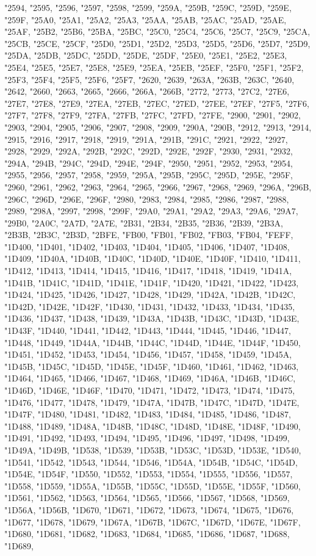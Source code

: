 "2594, "2595, "2596, "2597, "2598, "2599, "259A, "259B, "259C, "259D, "259E, "259F, "25A0, "25A1, "25A2, "25A3, "25AA, "25AB, "25AC, "25AD, "25AE, "25AF, "25B2, "25B6, "25BA, "25BC, "25C0, "25C4, "25C6, "25C7, "25C9, "25CA, "25CB, "25CE, "25CF, "25D0, "25D1, "25D2, "25D3, "25D5, "25D6, "25D7, "25D9, "25DA, "25DB, "25DC, "25DD, "25DE, "25DF, "25E0, "25E1, "25E2, "25E3, "25E4, "25E5, "25E7, "25E8, "25E9, "25EA, "25EB, "25EF, "25F0, "25F1, "25F2, "25F3, "25F4, "25F5, "25F6, "25F7, "2620, "2639, "263A, "263B, "263C, "2640, "2642, "2660, "2663, "2665, "2666, "266A, "266B, "2772, "2773, "27C2, "27E6, "27E7, "27E8, "27E9, "27EA, "27EB, "27EC, "27ED, "27EE, "27EF, "27F5, "27F6, "27F7, "27F8, "27F9, "27FA, "27FB, "27FC, "27FD, "27FE, "2900, "2901, "2902, "2903, "2904, "2905, "2906, "2907, "2908, "2909, "290A, "290B, "2912, "2913, "2914, "2915, "2916, "2917, "2918, "2919, "291A, "291B, "291C, "2921, "2922, "2927, "2928, "2929, "292A, "292B, "292C, "292D, "292E, "292F, "2930, "2931, "2932, "294A, "294B, "294C, "294D, "294E, "294F, "2950, "2951, "2952, "2953, "2954, "2955, "2956, "2957, "2958, "2959, "295A, "295B, "295C, "295D, "295E, "295F, "2960, "2961, "2962, "2963, "2964, "2965, "2966, "2967, "2968, "2969, "296A, "296B, "296C, "296D, "296E, "296F, "2980, "2983, "2984, "2985, "2986, "2987, "2988, "2989, "298A, "2997, "2998, "299F, "29A0, "29A1, "29A2, "29A3, "29A6, "29A7, "29B0, "2A0C, "2A7D, "2A7E, "2B31, "2B34, "2B35, "2B36, "2B39, "2B3A, "2B3B, "2B3C, "2B3D, "2BFE, "FB00, "FB01, "FB02, "FB03, "FB04, "FEFF, "1D400, "1D401, "1D402, "1D403, "1D404, "1D405, "1D406, "1D407, "1D408, "1D409, "1D40A, "1D40B, "1D40C, "1D40D, "1D40E, "1D40F, "1D410, "1D411, "1D412, "1D413, "1D414, "1D415, "1D416, "1D417, "1D418, "1D419, "1D41A, "1D41B, "1D41C, "1D41D, "1D41E, "1D41F, "1D420, "1D421, "1D422, "1D423, "1D424, "1D425, "1D426, "1D427, "1D428, "1D429, "1D42A, "1D42B, "1D42C, "1D42D, "1D42E, "1D42F, "1D430, "1D431, "1D432, "1D433, "1D434, "1D435, "1D436, "1D437, "1D438, "1D439, "1D43A, "1D43B, "1D43C, "1D43D, "1D43E, "1D43F, "1D440, "1D441, "1D442, "1D443, "1D444, "1D445, "1D446, "1D447, "1D448, "1D449, "1D44A, "1D44B, "1D44C, "1D44D, "1D44E, "1D44F, "1D450, "1D451, "1D452, "1D453, "1D454, "1D456, "1D457, "1D458, "1D459, "1D45A, "1D45B, "1D45C, "1D45D, "1D45E, "1D45F, "1D460, "1D461, "1D462, "1D463, "1D464, "1D465, "1D466, "1D467, "1D468, "1D469, "1D46A, "1D46B, "1D46C, "1D46D, "1D46E, "1D46F, "1D470, "1D471, "1D472, "1D473, "1D474, "1D475, "1D476, "1D477, "1D478, "1D479, "1D47A, "1D47B, "1D47C, "1D47D, "1D47E, "1D47F, "1D480, "1D481, "1D482, "1D483, "1D484, "1D485, "1D486, "1D487, "1D488, "1D489, "1D48A, "1D48B, "1D48C, "1D48D, "1D48E, "1D48F, "1D490, "1D491, "1D492, "1D493, "1D494, "1D495, "1D496, "1D497, "1D498, "1D499, "1D49A, "1D49B, "1D538, "1D539, "1D53B, "1D53C, "1D53D, "1D53E, "1D540, "1D541, "1D542, "1D543, "1D544, "1D546, "1D54A, "1D54B, "1D54C, "1D54D, "1D54E, "1D54F, "1D550, "1D552, "1D553, "1D554, "1D555, "1D556, "1D557, "1D558, "1D559, "1D55A, "1D55B, "1D55C, "1D55D, "1D55E, "1D55F, "1D560, "1D561, "1D562, "1D563, "1D564, "1D565, "1D566, "1D567, "1D568, "1D569, "1D56A, "1D56B, "1D670, "1D671, "1D672, "1D673, "1D674, "1D675, "1D676, "1D677, "1D678, "1D679, "1D67A, "1D67B, "1D67C, "1D67D, "1D67E, "1D67F, "1D680, "1D681, "1D682, "1D683, "1D684, "1D685, "1D686, "1D687, "1D688, "1D689, 